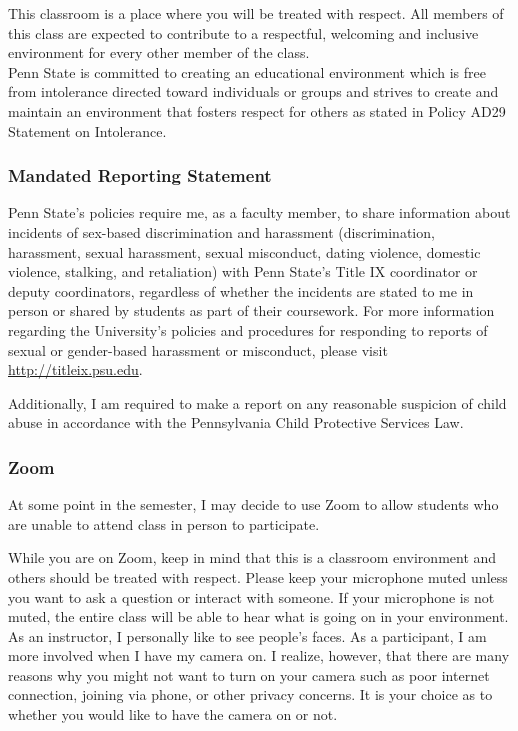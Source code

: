 \documentclass[
  letterpaper,
  DIV=11,
  numbers=noendperiod]{scrartcl}
\begin{document}
This classroom is a place where you will be treated with respect. All
members of this class are expected to contribute to a respectful,
welcoming and inclusive environment for every other member of the
class.\\
Penn State is committed to creating an educational environment which is
free from intolerance directed toward individuals or groups and strives
to create and maintain an environment that fosters respect for others as
stated in Policy AD29 Statement on Intolerance.

\subsubsection*{Mandated Reporting Statement}\label{mandated}

Penn State's policies require me, as a faculty member, to share
information about incidents of sex-based discrimination and harassment
(discrimination, harassment, sexual harassment, sexual misconduct,
dating violence, domestic violence, stalking, and retaliation) with Penn
State's Title IX coordinator or deputy coordinators, regardless of
whether the incidents are stated to me in person or shared by students
as part of their coursework. For more information regarding the
University's policies and procedures for responding to reports of sexual
or gender-based harassment or misconduct, please visit
\url{http://titleix.psu.edu}.

Additionally, I am required to make a report on any reasonable suspicion
of child abuse in accordance with the Pennsylvania Child Protective
Services Law.

\subsubsection*{Zoom}\label{zoom}

At some point in the semester, I may decide to use Zoom to allow
students who are unable to attend class in person to participate.

While you are on Zoom, keep in mind that this is a classroom environment
and others should be treated with respect. Please keep your microphone
muted unless you want to ask a question or interact with someone. If
your microphone is not muted, the entire class will be able to hear what
is going on in your environment. As an instructor, I personally like to
see people's faces. As a participant, I am more involved when I have my
camera on. I realize, however, that there are many reasons why you might
not want to turn on your camera such as poor internet connection,
joining via phone, or other privacy concerns. It is your choice as to
whether you would like to have the camera on or not.
\end{document}
